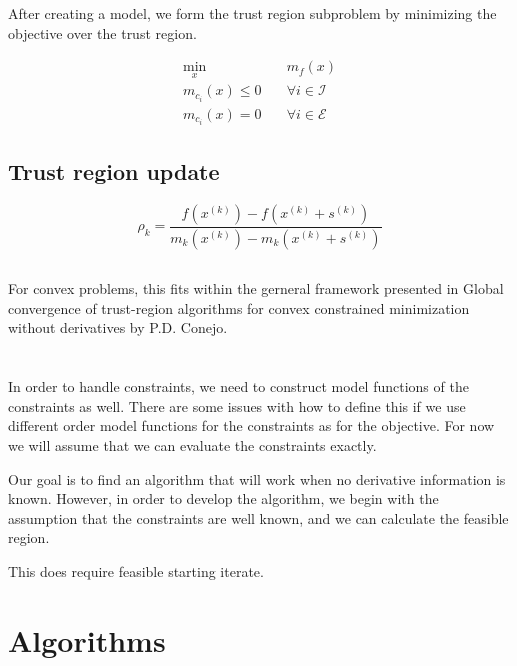 \documentclass{article}
\begin{document}
After creating a model, we form the trust region subproblem by minimizing the objective over the trust region.






\begin{center}
\begin{align}
\label{problem}
\min_x & \quad m_f(x) \\
  m_{c_i}(x) \le 0   & \quad \forall i \in \mathcal {I} \nonumber \\
  m_{c_i}(x)  = 0    & \quad \forall i \in \mathcal {E} \nonumber
\end{align}
\end{center}



\subsection{Trust region update}
$$\rho_k = \frac{f(x^{(k)}) - f(x^{(k)}+s^{(k)})}{m_k(x^{(k)}) - m_k(x^{(k)}+s^{(k)})}$$



\subsection{}
For convex problems, this fits within the gerneral framework presented in Global convergence of trust-region algorithms for convex constrained minimization without derivatives by P.D. Conejo.


\section{}
In order to handle constraints, we need to construct model functions of the constraints as well.
There are some issues with how to define this if we use different order model functions for the constraints as for the objective.
For now we will assume that we can evaluate the constraints exactly.

Our goal is to find an algorithm that will work when no derivative information is known.
However, in order to develop the algorithm, we begin with the assumption that the constraints are well known, and we can calculate the feasible region.

This does require feasible starting iterate.


\section{Algorithms}
\end{document}
